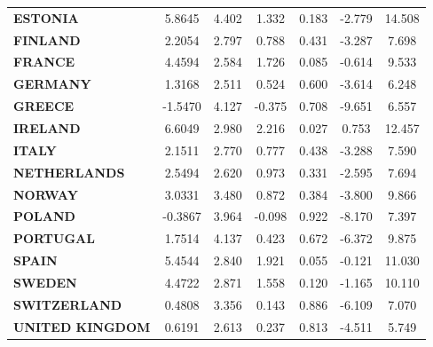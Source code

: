 \documentclass[ 11pt]{article}
\begin{document}
\begin{center}
\begin{tabular}{lcccccc}
\textbf{ESTONIA}               &       5.8645  &        4.402     &     1.332  &         0.183        &       -2.779    &       14.508     \\
\textbf{FINLAND}               &       2.2054  &        2.797     &     0.788  &         0.431        &       -3.287    &        7.698     \\
\textbf{FRANCE}                &       4.4594  &        2.584     &     1.726  &         0.085        &       -0.614    &        9.533     \\
\textbf{GERMANY}               &       1.3168  &        2.511     &     0.524  &         0.600        &       -3.614    &        6.248     \\
\textbf{GREECE}                &      -1.5470  &        4.127     &    -0.375  &         0.708        &       -9.651    &        6.557     \\
\textbf{IRELAND}               &       6.6049  &        2.980     &     2.216  &         0.027        &        0.753    &       12.457     \\
\textbf{ITALY}                 &       2.1511  &        2.770     &     0.777  &         0.438        &       -3.288    &        7.590     \\
\textbf{NETHERLANDS}           &       2.5494  &        2.620     &     0.973  &         0.331        &       -2.595    &        7.694     \\
\textbf{NORWAY}                &       3.0331  &        3.480     &     0.872  &         0.384        &       -3.800    &        9.866     \\
\textbf{POLAND}                &      -0.3867  &        3.964     &    -0.098  &         0.922        &       -8.170    &        7.397     \\
\textbf{PORTUGAL}              &       1.7514  &        4.137     &     0.423  &         0.672        &       -6.372    &        9.875     \\
\textbf{SPAIN}                 &       5.4544  &        2.840     &     1.921  &         0.055        &       -0.121    &       11.030     \\
\textbf{SWEDEN}                &       4.4722  &        2.871     &     1.558  &         0.120        &       -1.165    &       10.110     \\
\textbf{SWITZERLAND}           &       0.4808  &        3.356     &     0.143  &         0.886        &       -6.109    &        7.070     \\
\textbf{UNITED KINGDOM}        &       0.6191  &        2.613     &     0.237  &         0.813        &       -4.511    &        5.749     \\

\end{tabular}
\end{center}
\end{document}
